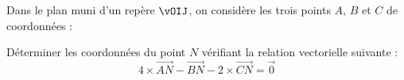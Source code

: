 \begin{exo}{}
	Dans le plan muni d'un repère $\vOIJ$, on considère les trois points $A$, $B$ et $C$ de coordonnées : 

	Déterminer les coordonnées du point $N$ vérifiant la relation vectorielle suivante :
	\[
		4 \times \vec{AN} - \vec{BN} - 2 \times \vec{CN} = \vec{0}
	\]
\end{exo}
